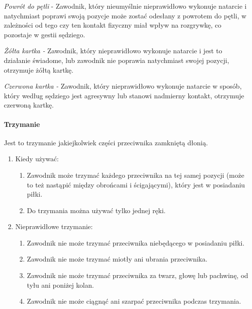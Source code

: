 \documentclass[12pt]{article}
\begin{document}
\emph{Powrót do pętli} - Zawodnik, który nieumyślnie nieprawidłowo
wykonuje natarcie i natychmiast poprawi swoją pozycje może zostać
odesłany z powrotem do pętli, w zależności od tego czy ten kontakt
fizyczny miał wpływ na rozgrywkę, co pozostaje w gestii sędziego.

\emph{Żółta kartka -} Zawodnik, który nieprawidłowo wykonuje natarcie i
jest to działanie świadome, lub zawodnik nie poprawia natychmiast swojej
pozycji, otrzymuje żółtą kartkę.

\emph{Czerwona kartka -} Zawodnik, który nieprawidłowo wykonuje natarcie
w sposób, który według sędziego jest agresywny lub stanowi nadmierny
kontakt, otrzymuje czerwoną kartkę.

\paragraph{Trzymanie}
Jest to trzymanie jakiejkolwiek części
przeciwnika zamkniętą dłonią.

\begin{enumerate}
	\item
	      Kiedy używać:

	      \begin{enumerate}
		      \item Zawodnik może trzymać każdego przeciwnika na tej samej pozycji
		            (może to też nastąpić między obrońcami i ścigającymi), który jest w
		            posiadaniu piłki.
		      \item
		            Do trzymania można używać tylko jednej ręki.
	      \end{enumerate}
	\item
	      Nieprawidłowe trzymanie:

	      \begin{enumerate}
		      \item
		            Zawodnik nie może trzymać przeciwnika niebędącego w posiadaniu
		            piłki.
		      \item
		            Zawodnik nie może trzymać miotły ani ubrania przeciwnika.
		      \item
		            Zawodnik nie może trzymać przeciwnika za twarz, głowę lub pachwinę,
		            od tyłu ani poniżej kolan.
		      \item Zawodnik nie może ciągnąć ani szarpać przeciwnika podczas
		            trzymania.
	      \end{enumerate}
\end{enumerate}
\end{document}
